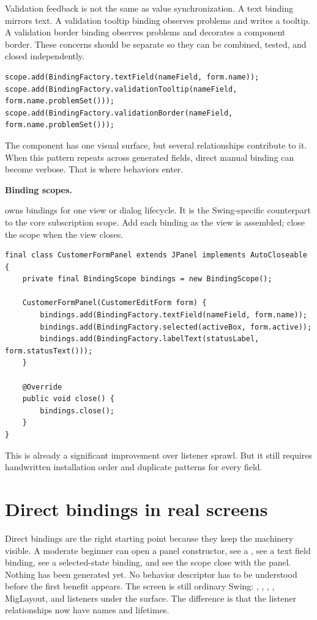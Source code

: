 Validation feedback is not the same as value synchronization. A text binding
mirrors text. A validation tooltip binding observes problems and writes a
tooltip. A validation border binding observes problems and decorates a component
border. These concerns should be separate so they can be combined, tested, and
closed independently.

\begin{lstlisting}[caption={Separate binding concerns for one field.}]
scope.add(BindingFactory.textField(nameField, form.name));
scope.add(BindingFactory.validationTooltip(nameField, form.name.problemSet()));
scope.add(BindingFactory.validationBorder(nameField, form.name.problemSet()));
\end{lstlisting}

The component has one visual surface, but several relationships contribute to
it. When this pattern repeats across generated fields, direct manual binding can
become verbose. That is where behaviors enter.

\textbf{Binding scopes.}

 owns bindings for one view or dialog lifecycle. It is the
Swing-specific counterpart to the core subscription scope. Add each binding as
the view is assembled; close the scope when the view closes.

\begin{lstlisting}[caption={A direct binding scope.}]
final class CustomerFormPanel extends JPanel implements AutoCloseable {
    private final BindingScope bindings = new BindingScope();

    CustomerFormPanel(CustomerEditForm form) {
        bindings.add(BindingFactory.textField(nameField, form.name));
        bindings.add(BindingFactory.selected(activeBox, form.active));
        bindings.add(BindingFactory.labelText(statusLabel, form.statusText()));
    }

    @Override
    public void close() {
        bindings.close();
    }
}
\end{lstlisting}

This is already a significant improvement over listener sprawl. But it still
requires handwritten installation order and duplicate patterns for every field.

\section{Direct bindings in real screens}

Direct bindings are the right starting point because they keep the machinery
visible. A moderate beginner can open a panel constructor, see a
, see a text field binding, see a selected-state binding,
and see the scope close with the panel. Nothing has been generated yet. No
behavior descriptor has to be understood before the first benefit appears. The
screen is still ordinary Swing: , ,
, , MigLayout, and listeners under the surface. The
difference is that the listener relationships now have names and lifetimes.

